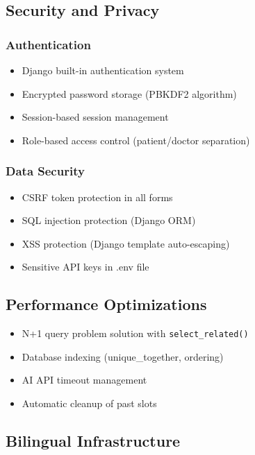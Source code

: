 \documentclass[12pt,a4paper]{article}
\begin{document}
\subsection{Security and Privacy}

\subsubsection{Authentication}
\begin{itemize}
    \item Django built-in authentication system
    \item Encrypted password storage (PBKDF2 algorithm)
    \item Session-based session management
    \item Role-based access control (patient/doctor separation)
\end{itemize}

\subsubsection{Data Security}
\begin{itemize}
    \item CSRF token protection in all forms
    \item SQL injection protection (Django ORM)
    \item XSS protection (Django template auto-escaping)
    \item Sensitive API keys in .env file
\end{itemize}

\subsection{Performance Optimizations}

\begin{itemize}
    \item N+1 query problem solution with \texttt{select\_related()}
    \item Database indexing (unique\_together, ordering)
    \item AI API timeout management
    \item Automatic cleanup of past slots
\end{itemize}

\subsection{Bilingual Infrastructure}
\end{document}
